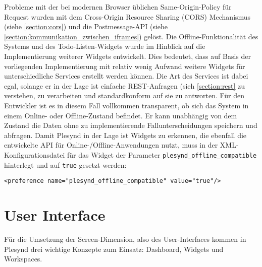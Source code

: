 Probleme mit der bei modernen Browser üblichen Same-Origin-Policy für Request wurden mit dem Cross-Origin Resource Sharing (CORS) Mechanismus (siehe \ref{section:cors}) und die Postmessage-API (siehe \ref{section:kommunikation_zwischen_iframes}) gelöst. Die Offline-Funktionalität des Systems und des Todo-Listen-Widgets wurde im Hinblick auf die Implementierung weiterer Widgets entwickelt. Dies bedeutet, dass auf Basis der vorliegenden Implementierung mit relativ wenig Aufwand weitere Widgets für unterschiedliche Services erstellt werden können. Die Art des Services ist dabei egal, solange er in der Lage ist einfache REST-Anfragen (sieh \ref{section:rest} zu verstehen, zu verarbeiten und standardkonform auf sie zu antworten. Für den Entwickler ist es in diesem Fall vollkommen transparent, ob sich das System in einem Online- oder Offline-Zustand befindet. Er kann unabhängig von dem Zustand die Daten ohne zu implementierende Fallunterscheidungen speichern und abfragen. Damit Plesynd in der Lage ist Widgets zu erkennen, die ebenfall die entwickelte API für Online-/Offline-Anwendungen nutzt, muss in der XML-Konfigurationsdatei für das Widget der Parameter \texttt{plesynd\_offline\_compatible} hinterlegt und auf \texttt{true} gesetzt werden:
\begin{lstlisting}
<preference name="plesynd_offline_compatible" value="true"/>
\end{lstlisting}

\section{User Interface}\label{section:user_interface}
Für die Umsetzung der Screen-Dimension, also des User-Interfaces kommen in Plesynd drei wichtige Konzepte zum Einsatz: Dashboard, Widgets und Workspaces. 

